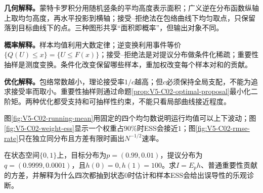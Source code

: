 \nopagebreak[4]
\label{struct:V5-C02-CH14}
\nopagebreak[4]
\textbf{几何解释。}蒙特卡罗积分用随机竖条的平均高度表示面积；广义逆在分布函数纵轴上取均匀高度，再水平投影到横轴；接受--拒绝法在包络曲线下均匀取点，只保留落到目标曲线下的点。三种图形共享“面积即概率”，但输出对象不同。

\label{struct:V5-C02-CH15}
\textbf{概率解释。}样本均值利用大数定律；逆变换利用事件等价$\{Q(U)\le x\}=\{U\le F(x)\}$；接受--拒绝法是对提议分布做条件化稀疏；重要性抽样是测度变换。条件化改变保留哪些样本，重加权改变每个样本对和的贡献。

\label{struct:V5-C02-CH16}
\textbf{优化解释。}包络常数越小，理论接受率$1/c$越高；但$c$必须保持全局支配，不能为追求接受率而取小。重要性抽样则通过命题\ref{prop:V5-C02-optimal-proposal}最小化二阶矩。两种优化都受支持和可抽样性约束，不能只看局部曲线接近程度。

\label{struct:V5-C02-CH17}
图\ref{fig:V5-C02-running-mean}用固定的四个均匀数说明运行均值可以上下波动；图\ref{fig:V5-C02-weight-ess}显示一个权重占$90\%$时ESS会接近$1$；图\ref{fig:V5-C02-rmse-rate}只在独立同分布且方差有限时画出$N^{-1/2}$速率。




\label{struct:V5-C02-CH18}
\begin{example}[稀有事件下的重要性抽样高方差]\label{exm:V5-C02-four-uniforms}
在状态空间$\{0,1\}$上，目标分布为$p=(0.99,0.01)$，提议分布为$q=(0.9999,0.0001)$，且$h(0)=0,h(1)=100$。求$I=E_p h$、普通重要性贡献的方差，并解释为什么四次都抽到状态$0$时估计和样本ESS会给出误导性的乐观诊断。
\end{example}

